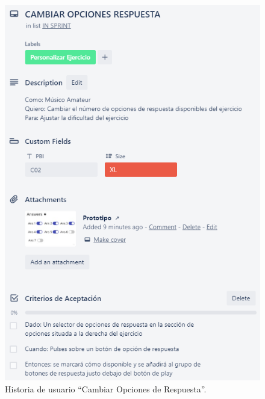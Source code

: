 \documentclass[12pt,twoside,titlepage]{report}
\begin{document}
{\begin{figure}[H]
    \centering
    \includegraphics[scale=1.3]{Scrum/User Stories/CambiarRespuestas}
    \caption{Historia de usuario ``Cambiar Opciones de Respuesta''.}
    \label{fig:CambiarRespuestas}
\end{figure}

}
\end{document}
